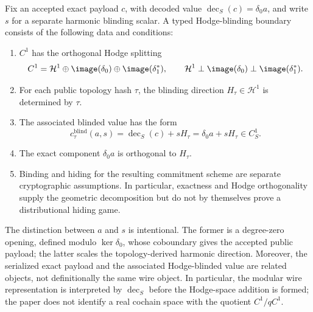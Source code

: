 \begin{definition}\label{def:blinded-commitment-boundary}
  Fix an accepted exact payload \(c\), with decoded value
  \(\operatorname{dec}_S(c)=\delta_0a\), and write \(s\) for a separate
  harmonic blinding scalar. A typed Hodge-blinding boundary consists of the
  following data and conditions:
  \begin{enumerate}[label=(\roman*)]
    \item \(C^1\) has the orthogonal Hodge splitting
      \[
        C^1
        =
        \mathcal H^1\oplus\image(\delta_0)\oplus\image(\delta_1^\ast),
        \qquad
        \mathcal H^1\perp\image(\delta_0)\perp\image(\delta_1^\ast).
      \]
    \item For each public topology hash \(\tau\), the blinding direction
      \(H_\tau\in\mathcal H^1\) is determined by \(\tau\).
    \item The associated blinded value has the form
      \[
        c^{\mathrm{blind}}_\tau(a,s)
        =\operatorname{dec}_S(c)+sH_\tau
        =\delta_0a+sH_\tau\in C_S^1 .
      \]
    \item The exact component \(\delta_0a\) is orthogonal to \(H_\tau\).
    \item Binding and hiding for the resulting commitment scheme are separate
      cryptographic assumptions. In particular, exactness and Hodge
      orthogonality supply the geometric decomposition but do not by
      themselves prove a distributional hiding game.
  \end{enumerate}
\end{definition}

The distinction between \(a\) and \(s\) is intentional.  The former is a
degree-zero opening, defined modulo \(\ker\delta_0\), whose coboundary gives
the accepted public payload; the
latter scales the topology-derived harmonic direction.  Moreover, the
serialized exact payload and the associated Hodge-blinded value are related
objects, not definitionally the same wire object. In particular, the modular
wire representation is interpreted by \(\operatorname{dec}_S\) before the
Hodge-space addition is formed; the paper does not identify a real cochain
space with the quotient \(C^1/qC^1\).

